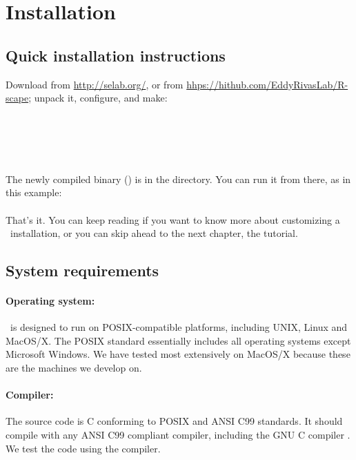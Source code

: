 \section{Installation}
\label{section:installation}
\setcounter{footnote}{0}

\subsection{Quick installation instructions}

Download  from
\url{http://selab.org/}, or from
\url{hhps://hithub.com/EddyRivasLab/R-scape}; unpack it, configure,
and make:\\

\\
\\
\\ 
\\
\\

The newly compiled binary (\prog{\rscape}) is in the
 directory. You can run it from there,
as in this example:\\

\\


That's it.  You can keep reading if you want to know more about
customizing a \rscape\ installation, or you can skip ahead to the next
chapter, the tutorial.


\subsection{System requirements}

\paragraph{Operating system:} \rscape\ is designed to run on
POSIX-compatible platforms, including UNIX, Linux and MacOS/X. The
POSIX standard essentially includes all operating systems except
Microsoft Windows. We have tested most extensively on MacOS/X because
these are the machines we develop on.

\paragraph{Compiler:} The source code is C conforming to POSIX and ANSI
C99 standards. It should compile with any ANSI C99 compliant compiler,
including the GNU C compiler . We test the code using the
 compiler.

